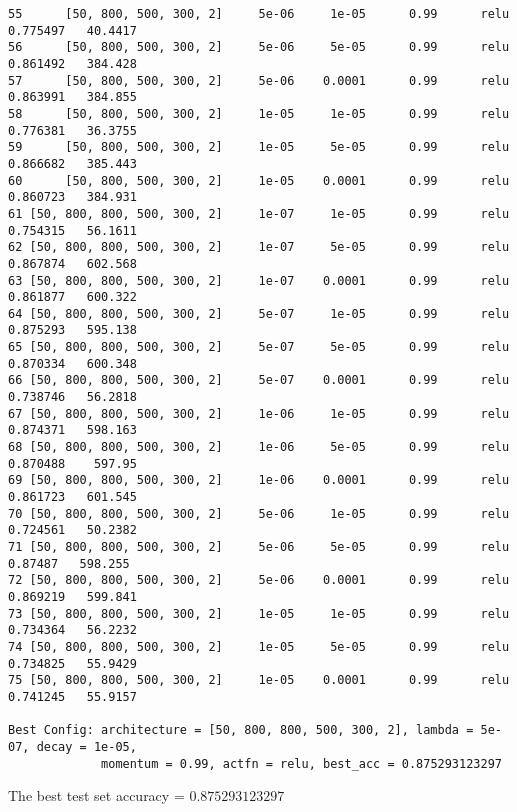 \documentclass[letter,doc,notimes]{article}
\begin{document}
\begin{verbatim}
55      [50, 800, 500, 300, 2]     5e-06     1e-05      0.99      relu  0.775497   40.4417
56      [50, 800, 500, 300, 2]     5e-06     5e-05      0.99      relu  0.861492   384.428
57      [50, 800, 500, 300, 2]     5e-06    0.0001      0.99      relu  0.863991   384.855
58      [50, 800, 500, 300, 2]     1e-05     1e-05      0.99      relu  0.776381   36.3755
59      [50, 800, 500, 300, 2]     1e-05     5e-05      0.99      relu  0.866682   385.443
60      [50, 800, 500, 300, 2]     1e-05    0.0001      0.99      relu  0.860723   384.931
61 [50, 800, 800, 500, 300, 2]     1e-07     1e-05      0.99      relu  0.754315   56.1611
62 [50, 800, 800, 500, 300, 2]     1e-07     5e-05      0.99      relu  0.867874   602.568
63 [50, 800, 800, 500, 300, 2]     1e-07    0.0001      0.99      relu  0.861877   600.322
64 [50, 800, 800, 500, 300, 2]     5e-07     1e-05      0.99      relu  0.875293   595.138
65 [50, 800, 800, 500, 300, 2]     5e-07     5e-05      0.99      relu  0.870334   600.348
66 [50, 800, 800, 500, 300, 2]     5e-07    0.0001      0.99      relu  0.738746   56.2818
67 [50, 800, 800, 500, 300, 2]     1e-06     1e-05      0.99      relu  0.874371   598.163
68 [50, 800, 800, 500, 300, 2]     1e-06     5e-05      0.99      relu  0.870488    597.95
69 [50, 800, 800, 500, 300, 2]     1e-06    0.0001      0.99      relu  0.861723   601.545
70 [50, 800, 800, 500, 300, 2]     5e-06     1e-05      0.99      relu  0.724561   50.2382
71 [50, 800, 800, 500, 300, 2]     5e-06     5e-05      0.99      relu   0.87487   598.255
72 [50, 800, 800, 500, 300, 2]     5e-06    0.0001      0.99      relu  0.869219   599.841
73 [50, 800, 800, 500, 300, 2]     1e-05     1e-05      0.99      relu  0.734364   56.2232
74 [50, 800, 800, 500, 300, 2]     1e-05     5e-05      0.99      relu  0.734825   55.9429
75 [50, 800, 800, 500, 300, 2]     1e-05    0.0001      0.99      relu  0.741245   55.9157

Best Config: architecture = [50, 800, 800, 500, 300, 2], lambda = 5e-07, decay = 1e-05, 
             momentum = 0.99, actfn = relu, best_acc = 0.875293123297
\end{verbatim}

The best test set accuracy  = $0.875293123297$
\end{document}
